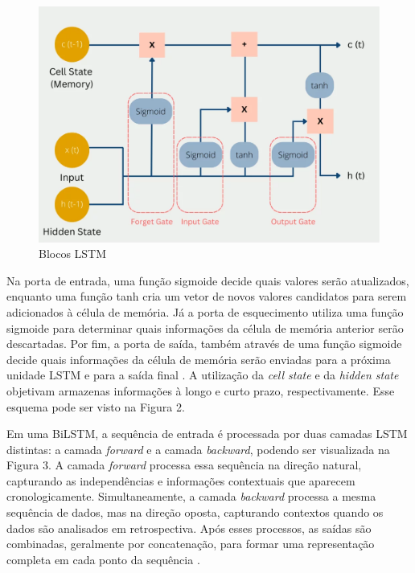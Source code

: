 \documentclass[conference]{IEEEtran}
\begin{document}
\begin{figure}[h!]
    \centering
    \includegraphics[width=\linewidth]{lstm.png}
    \caption{Blocos LSTM}
    \label{fig:exemplo1}
\end{figure}

Na porta de entrada, uma função sigmoide decide quais valores serão atualizados, enquanto uma função tanh cria um vetor de novos valores candidatos para serem adicionados à célula de memória. Já a porta de esquecimento utiliza uma função sigmoide para determinar quais informações da célula de memória anterior serão descartadas. Por fim, a porta de saída, também através de uma função sigmoide decide quais informações da célula de memória serão enviadas para a próxima unidade LSTM e para a saída final \cite{lstms}. A utilização da \textit{cell state} e da \textit{hidden state} objetivam armazenas informações à longo e curto prazo, respectivamente. Esse esquema pode ser visto na Figura 2.

\indent Em uma BiLSTM, a sequência de entrada é processada por duas camadas LSTM distintas: a camada \textit{forward} e a camada \textit{backward}, podendo ser visualizada na Figura 3. A camada \textit{forward} processa essa sequência na direção natural, capturando as independências e informações contextuais que aparecem cronologicamente. Simultaneamente, a camada \textit{backward} processa a mesma sequência de dados, mas na direção oposta, capturando contextos quando os dados são analisados em retrospectiva. Após esses processos, as saídas são combinadas, geralmente por concatenação, para formar uma representação completa em cada ponto da sequência \cite{bilstm}.
\end{document}
